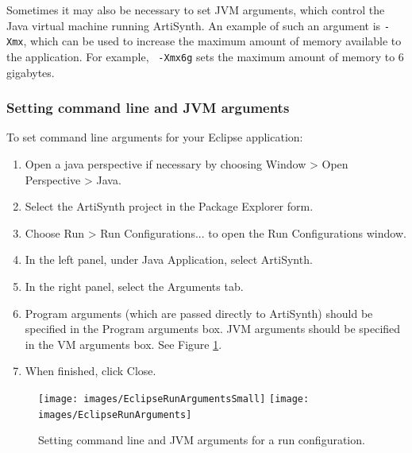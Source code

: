 Sometimes it may also be necessary to set JVM arguments, which control
the Java virtual machine running ArtiSynth.  An example of such an
argument is {\tt -Xmx}, which can be used to increase the maximum
amount of memory available to the application.  For example, {\tt
-Xmx6g} sets the maximum amount of memory to 6 gigabytes.

\subsubsection {Setting command line and JVM arguments}
\label{SettingCommandLineArguments}

To set command line arguments for your Eclipse application:

\begin{enumerate}

\item Open a java perspective if necessary by choosing
  {\sf Window > Open Perspective > Java}.

\item Select the ArtiSynth project in the {\sf Package Explorer} form.

\item Choose {\sf Run > Run Configurations...} to open the {\sf Run
  Configurations} window.

\item In the left panel, under {\sf Java Application}, select {\sf ArtiSynth}.

\item In the right panel, select the {\sf Arguments} tab.

\item Program arguments (which are passed directly to ArtiSynth)
should be specified in the {\sf Program arguments} box.  JVM arguments
should be specified in the {\sf VM arguments} box. See Figure
\ref{EclipseRunArguments:fig}.

\item When finished, click {\sf Close}.

\end{enumerate}

\begin{figure}
\begin{center}
\iflatexml
\texttt{[image: images/EclipseRunArgumentsSmall]}
\else
\texttt{[image: images/EclipseRunArguments]}
\fi
\end{center}
\caption{Setting command line and JVM arguments for a run configuration.}%
\label{EclipseRunArguments:fig}
\end{figure}


